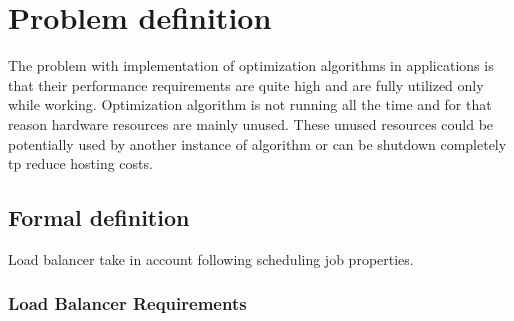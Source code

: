 
\chapter{Problem definition}\label{ch:problem-definition}

The problem with implementation of optimization algorithms in applications is that their
performance requirements are quite high and are fully utilized only while working.
Optimization algorithm is not running all the time and for that reason hardware resources are mainly unused.
These unused resources could be potentially used by another instance of algorithm
or can be shutdown completely tp reduce hosting costs.

\section{Formal definition}\label{sec:formal-definition}
Load balancer take in account following scheduling job properties.



\subsection{Load Balancer Requirements}\label{subsec:load-balancer-requirements}
